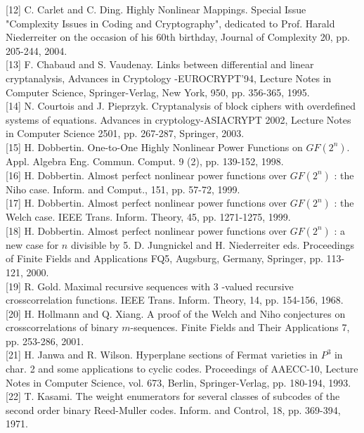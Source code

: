 \documentclass[10pt]{article}
\begin{document}
[12] C. Carlet and C. Ding. Highly Nonlinear Mappings. Special Issue "Complexity Issues in Coding and Cryptography", dedicated to Prof. Harald Niederreiter on the occasion of his 60th birthday, Journal of Complexity 20, pp. 205-244, 2004.\\[0pt]
[13] F. Chabaud and S. Vaudenay. Links between differential and linear cryptanalysis, Advances in Cryptology -EUROCRYPT'94, Lecture Notes in Computer Science, Springer-Verlag, New York, 950, pp. 356-365, 1995.\\[0pt]
[14] N. Courtois and J. Pieprzyk. Cryptanalysis of block ciphers with overdefined systems of equations. Advances in cryptology-ASIACRYPT 2002, Lecture Notes in Computer Science 2501, pp. 267-287, Springer, 2003.\\[0pt]
[15] H. Dobbertin. One-to-One Highly Nonlinear Power Functions on $G F\left(2^{n}\right)$. Appl. Algebra Eng. Commun. Comput. 9 (2), pp. 139-152, 1998.\\[0pt]
[16] H. Dobbertin. Almost perfect nonlinear power functions over $G F\left(2^{n}\right)$ : the Niho case. Inform. and Comput., 151, pp. 57-72, 1999.\\[0pt]
[17] H. Dobbertin. Almost perfect nonlinear power functions over $G F\left(2^{n}\right)$ : the Welch case. IEEE Trans. Inform. Theory, 45, pp. 1271-1275, 1999.\\[0pt]
[18] H. Dobbertin. Almost perfect nonlinear power functions over $G F\left(2^{n}\right)$ : a new case for $n$ divisible by 5. D. Jungnickel and H. Niederreiter eds. Proceedings of Finite Fields and Applications FQ5, Augsburg, Germany, Springer, pp. 113-121, 2000.\\[0pt]
[19] R. Gold. Maximal recursive sequences with 3 -valued recursive crosscorrelation functions. IEEE Trans. Inform. Theory, 14, pp. 154-156, 1968.\\[0pt]
[20] H. Hollmann and Q. Xiang. A proof of the Welch and Niho conjectures on crosscorrelations of binary $m$-sequences. Finite Fields and Their Applications 7, pp. 253-286, 2001.\\[0pt]
[21] H. Janwa and R. Wilson. Hyperplane sections of Fermat varieties in $P^{3}$ in char. 2 and some applications to cyclic codes. Proceedings of AAECC-10, Lecture Notes in Computer Science, vol. 673, Berlin, Springer-Verlag, pp. 180-194, 1993.\\[0pt]
[22] T. Kasami. The weight enumerators for several classes of subcodes of the second order binary Reed-Muller codes. Inform. and Control, 18, pp. 369-394, 1971.\\[0pt]
\end{document}
